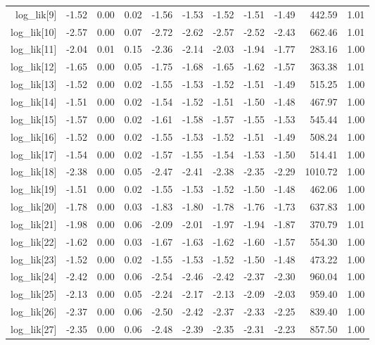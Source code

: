 \begin{table}[ht]
\begin{tabular}{rrrrrrrrrrr}
  log\_lik[9] & -1.52 & 0.00 & 0.02 & -1.56 & -1.53 & -1.52 & -1.51 & -1.49 & 442.59 & 1.01 \\ 
  log\_lik[10] & -2.57 & 0.00 & 0.07 & -2.72 & -2.62 & -2.57 & -2.52 & -2.43 & 662.46 & 1.01 \\ 
  log\_lik[11] & -2.04 & 0.01 & 0.15 & -2.36 & -2.14 & -2.03 & -1.94 & -1.77 & 283.16 & 1.00 \\ 
  log\_lik[12] & -1.65 & 0.00 & 0.05 & -1.75 & -1.68 & -1.65 & -1.62 & -1.57 & 363.38 & 1.01 \\ 
  log\_lik[13] & -1.52 & 0.00 & 0.02 & -1.55 & -1.53 & -1.52 & -1.51 & -1.49 & 515.25 & 1.00 \\ 
  log\_lik[14] & -1.51 & 0.00 & 0.02 & -1.54 & -1.52 & -1.51 & -1.50 & -1.48 & 467.97 & 1.00 \\ 
  log\_lik[15] & -1.57 & 0.00 & 0.02 & -1.61 & -1.58 & -1.57 & -1.55 & -1.53 & 545.44 & 1.00 \\ 
  log\_lik[16] & -1.52 & 0.00 & 0.02 & -1.55 & -1.53 & -1.52 & -1.51 & -1.49 & 508.24 & 1.00 \\ 
  log\_lik[17] & -1.54 & 0.00 & 0.02 & -1.57 & -1.55 & -1.54 & -1.53 & -1.50 & 514.41 & 1.00 \\ 
  log\_lik[18] & -2.38 & 0.00 & 0.05 & -2.47 & -2.41 & -2.38 & -2.35 & -2.29 & 1010.72 & 1.00 \\ 
  log\_lik[19] & -1.51 & 0.00 & 0.02 & -1.55 & -1.53 & -1.52 & -1.50 & -1.48 & 462.06 & 1.00 \\ 
  log\_lik[20] & -1.78 & 0.00 & 0.03 & -1.83 & -1.80 & -1.78 & -1.76 & -1.73 & 637.83 & 1.00 \\ 
  log\_lik[21] & -1.98 & 0.00 & 0.06 & -2.09 & -2.01 & -1.97 & -1.94 & -1.87 & 370.79 & 1.01 \\ 
  log\_lik[22] & -1.62 & 0.00 & 0.03 & -1.67 & -1.63 & -1.62 & -1.60 & -1.57 & 554.30 & 1.00 \\ 
  log\_lik[23] & -1.52 & 0.00 & 0.02 & -1.55 & -1.53 & -1.52 & -1.50 & -1.48 & 473.22 & 1.00 \\ 
  log\_lik[24] & -2.42 & 0.00 & 0.06 & -2.54 & -2.46 & -2.42 & -2.37 & -2.30 & 960.04 & 1.00 \\ 
  log\_lik[25] & -2.13 & 0.00 & 0.05 & -2.24 & -2.17 & -2.13 & -2.09 & -2.03 & 959.40 & 1.00 \\ 
  log\_lik[26] & -2.37 & 0.00 & 0.06 & -2.50 & -2.42 & -2.37 & -2.33 & -2.25 & 839.40 & 1.00 \\ 
  log\_lik[27] & -2.35 & 0.00 & 0.06 & -2.48 & -2.39 & -2.35 & -2.31 & -2.23 & 857.50 & 1.00 \\ 

\end{tabular}
\end{table}
